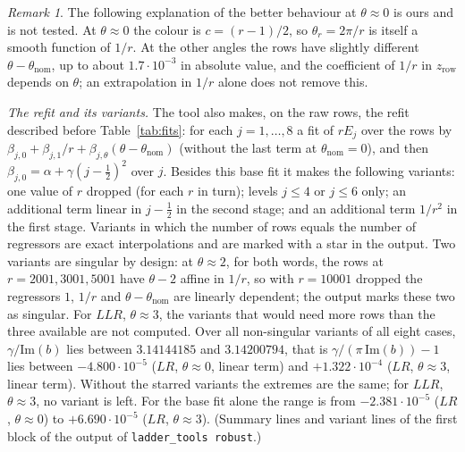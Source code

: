 \documentclass[11pt]{amsart}
\theoremstyle{definition}
\theoremstyle{remark}
\newtheorem{remark}[conjecture]{Remark}
\begin{document}
\begin{remark}\label{rem:thetazero}
The following explanation of the better behaviour at $\theta \approx 0$ is ours and is
not tested. At $\theta \approx 0$ the colour is $c = (r-1)/2$, so $\theta_r = 2\pi/r$
is itself a smooth function of $1/r$. At the other angles the rows have slightly
different $\theta - \theta_{\mathrm{nom}}$, up to about $1.7\cdot10^{-3}$ in absolute
value, and the coefficient of
$1/r$ in $z_{\mathrm{row}}$ depends on $\theta$; an extrapolation in $1/r$ alone does
not remove this.
\end{remark}

\emph{The refit and its variants.} The tool also makes, on the raw rows, the refit
described before Table~\ref{tab:fits}: for each $j = 1, \dots, 8$ a fit of $rE_j$
over the rows by $\beta_{j,0} + \beta_{j,1}/r + \beta_{j,\theta}(\theta -
\theta_{\mathrm{nom}})$ (without the last term at $\theta_{\mathrm{nom}} = 0$), and
then $\beta_{j,0} = \alpha + \gamma(j-\frac12)^2$ over $j$. Besides this base fit it
makes the following variants: one value of $r$ dropped (for each $r$ in turn); levels
$j \le 4$ or $j \le 6$ only; an additional term linear in $j-\frac12$ in the second
stage; and an additional term $1/r^2$ in the first
stage. Variants in which the number of rows equals the number of regressors are exact
interpolations and are marked with a star in the output. Two variants are singular by
design: at $\theta \approx 2$, for both words, the rows at $r = 2001, 3001, 5001$ have
$\theta - 2$ affine in $1/r$, so with $r = 10001$ dropped the regressors $1$, $1/r$
and $\theta - \theta_{\mathrm{nom}}$ are linearly dependent; the output marks these
two as singular. For $LLR$, $\theta \approx 3$, the variants that would need more
rows than the three available are not computed. Over all non-singular variants of
all eight cases, $\gamma/\mathrm{Im}(b)$ lies between $3.14144185$ and $3.14200794$,
that is $\gamma/(\pi\,\mathrm{Im}(b)) - 1$ lies between $-4.800\cdot10^{-5}$ ($LR$,
$\theta \approx 0$, linear term) and $+1.322\cdot10^{-4}$ ($LR$, $\theta \approx 3$,
linear term). Without the starred variants the extremes are the same; for $LLR$,
$\theta \approx 3$, no variant is left. For the base fit alone the range is from
$-2.381\cdot10^{-5}$ ($LR$, $\theta \approx 0$) to $+6.690\cdot10^{-5}$ ($LR$,
$\theta \approx 3$). (Summary lines and variant lines of the first block of the output
of \texttt{ladder\_tools robust}.)
\end{document}
